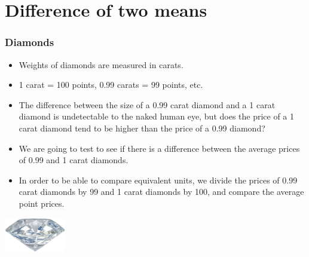 
\section{Difference of two means}


\begin{frame}
\frametitle{Diamonds}

\begin{itemize}

\item Weights of diamonds are measured in carats. 

\item 1 carat = 100 points, 0.99 carats = 99 points, etc.

\item The difference between the size of a 0.99 carat diamond and a 1 carat diamond is undetectable to the naked human eye, but does the price of a 1 carat diamond tend to be higher than the price of a 0.99 diamond?

\item We are going to test to see if there is a difference between the average prices of 0.99 and 1 carat diamonds.

\item In order to be able to compare equivalent units, we divide the prices of 0.99 carat diamonds by 99 and 1 carat diamonds by 100, and compare the average point prices.

\end{itemize}

\hfill \includegraphics[width=0.2\textwidth]{7-3_diff_two_mean/figures/diamonds/diamond}

\end{frame}


